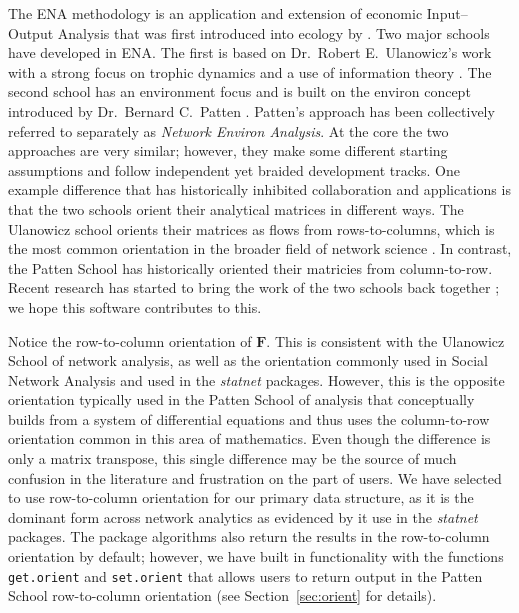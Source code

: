 \documentclass[article]{jss}
\begin{document}
The ENA methodology is an application and extension of economic
Input--Output Analysis \citep{leontief1936,leontief66} that was first
introduced into ecology by \citet{hannon73}.  Two major schools have
developed in ENA.  The first is based on Dr.\ Robert E.\ Ulanowicz's
work with a strong focus on trophic dynamics and a use of information
theory \citep{ulanowicz86, ulanowicz97, ulanowicz04}.  The second
school has an environment focus and is built on the environ concept
introduced by Dr.\ Bernard C.\ Patten \citep{patten76, patten78,
  fath99_review}.  Patten's approach has been collectively referred to
separately as \emph{Network Environ Analysis}. At the core the two
approaches are very similar; however, they make some different
starting assumptions and follow independent yet braided development
tracks. One example difference that has historically inhibited
collaboration and applications is that the two schools orient their
analytical matrices in different ways.  The Ulanowicz school orients
their matrices as flows from rows-to-columns, which is the most common
orientation in the broader field of network science
\citep[e.g.,][]{brandes05}.  In contrast, the Patten School has
historically oriented their matricies from column-to-row.  Recent
research has started to bring the work of the two schools back
together \citep[e.g.,][]{scharler09comparing}; we hope this software
contributes to this.

Notice the row-to-column orientation of $\mathbf{F}$.  This is
consistent with the Ulanowicz School of network analysis, as well as
the orientation commonly used in Social Network Analysis and used in
the \textit{statnet} packages.  However, this is the opposite
orientation typically used in the Patten School of analysis that
conceptually builds from a system of differential equations and thus
uses the column-to-row orientation common in this area of
mathematics. Even though the difference is only a matrix transpose,
this single difference may be the source of much confusion in the
literature and frustration on the part of users.  We have selected to
use row-to-column orientation for our primary data structure, as it is
the dominant form across network analytics as evidenced by it use in
the \textit{statnet} packages. The package algorithms also return the
results in the row-to-column orientation by default; however, we have
built in functionality with the functions \texttt{get.orient} and
\texttt{set.orient}  that allows users
to return output in the Patten School row-to-column orientation
(see Section~\ref{sec:orient} for details).
\end{document}
